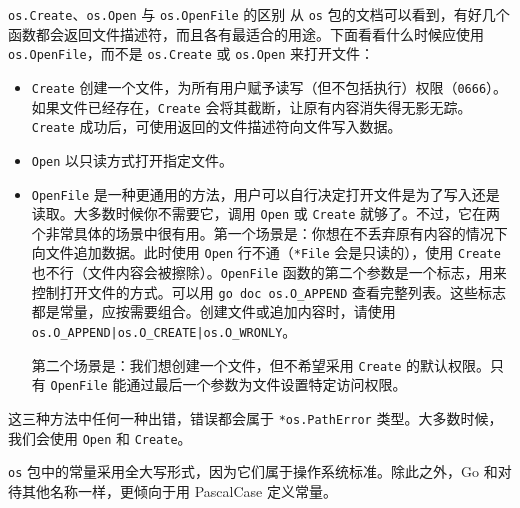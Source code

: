 \begin{infobox}{\texttt{os.Create}、\texttt{os.Open} 与 \texttt{os.OpenFile} 的区别}
从 \texttt{os} 包的文档可以看到，有好几个函数都会返回文件描述符，而且各有最适合的用途。下面看看什么时候应使用 \texttt{os.OpenFile}，而不是 \texttt{os.Create} 或 \texttt{os.Open} 来打开文件：

\begin{itemize}
  \item \texttt{Create} 创建一个文件，为所有用户赋予读写（但不包括执行）权限（\texttt{0666}）。如果文件已经存在，\texttt{Create} 会将其截断，让原有内容消失得无影无踪。\texttt{Create} 成功后，可使用返回的文件描述符向文件写入数据。
  \item \texttt{Open} 以只读方式打开指定文件。
  \item \texttt{OpenFile} 是一种更通用的方法，用户可以自行决定打开文件是为了写入还是读取。大多数时候你不需要它，调用 \texttt{Open} 或 \texttt{Create} 就够了。不过，它在两个非常具体的场景中很有用。第一个场景是：你想在不丢弃原有内容的情况下向文件追加数据。此时使用 \texttt{Open} 行不通（\texttt{*File} 会是只读的），使用 \texttt{Create} 也不行（文件内容会被擦除）。\texttt{OpenFile} 函数的第二个参数是一个标志，用来控制打开文件的方式。可以用 \texttt{go doc os.O\_APPEND} 查看完整列表。这些标志都是常量，应按需要组合。创建文件或追加内容时，请使用 \texttt{os.O\_APPEND|os.O\_CREATE|os.O\_WRONLY}。

  第二个场景是：我们想创建一个文件，但不希望采用 \texttt{Create} 的默认权限。只有 \texttt{OpenFile} 能通过最后一个参数为文件设置特定访问权限。
\end{itemize}

这三种方法中任何一种出错，错误都会属于 \texttt{*os.PathError} 类型。大多数时候，我们会使用 \texttt{Open} 和
\texttt{Create}。
\end{infobox}

\texttt{os} 包中的常量采用全大写形式，因为它们属于操作系统标准。除此之外，Go 和对待其他名称一样，更倾向于用 PascalCase 定义常量。

